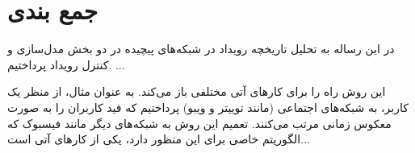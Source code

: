 \chapter{جمع بندی}\label{Chap:Chap6}

در این رساله به تحلیل تاریخچه رویداد در شبکه‌های پیچیده در دو بخش مدل‌سازی و کنترل رویداد پرداختیم.
...

این روش راه را برای کارهای آتی مختلفی باز می‌کند. به عنوان مثال، از منظر یک کاربر، به شبکه‌های اجتماعی‌ (مانند توییتر و ویبو) پرداختیم که فید کاربران را به صورت معکوس زمانی مرتب می‌کنند. تعمیم این روش به شبکه‌های دیگر مانند فیسبوک که الگوریتم خاصی برای این منظور دارد،‌ یکی  از کارهای آتی است...


